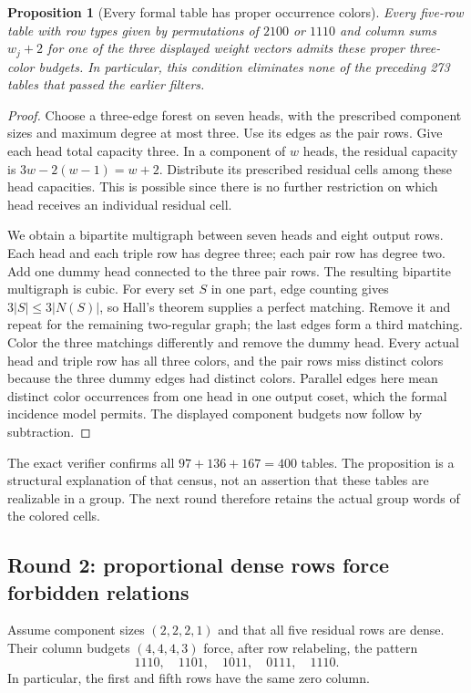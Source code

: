 \documentclass[11pt,a4paper,oneside]{report}
\newtheorem{proposition}[theorem]{Proposition}
\theoremstyle{definition}
\theoremstyle{remark}
\begin{document}
\begin{proposition}[Every formal table has proper occurrence colors]
\label{M13:nextcolor:all-margins}
Every five-row table with row types given by permutations of $2100$
or $1110$ and column sums $w_j+2$ for one of the three displayed
weight vectors admits these proper three-color budgets.
In particular, this condition eliminates none of the preceding
273 tables that passed the earlier filters.
\end{proposition}
\begin{proof}
Choose a three-edge forest on seven heads, with the prescribed
component sizes and maximum degree at most three. Use its edges
as the pair rows. Give each head total capacity three. In a
component of $w$ heads, the residual capacity is
$3w-2(w-1)=w+2$. Distribute its prescribed residual cells among
these head capacities. This is possible since there is no further
restriction on which head receives an individual residual cell.

We obtain a bipartite multigraph between seven heads and eight
output rows. Each head and each triple row has degree three;
each pair row has degree two. Add one dummy head connected to
the three pair rows. The resulting bipartite multigraph is cubic.
For every set $S$ in one part, edge counting gives
$3|S|\le3|N(S)|$, so Hall's theorem supplies a perfect matching.
Remove it and repeat for the remaining two-regular graph; the
last edges form a third matching. Color the three matchings
differently and remove the dummy head. Every actual head and
triple row has all three colors, and the pair rows miss distinct
colors because the three dummy edges had distinct colors.
Parallel edges here mean distinct color occurrences from one head
in one output coset, which the formal incidence model permits.
The displayed component budgets now follow by subtraction.
\end{proof}

The exact verifier confirms all $97+136+167=400$ tables.
The proposition is a structural explanation of that census, not
an assertion that these tables are realizable in a group. The next
round therefore retains the actual group words of the colored cells.

\subsection{Round 2: proportional dense rows force forbidden relations}

Assume component sizes $(2,2,2,1)$ and that all five residual rows
are dense. Their column budgets $(4,4,4,3)$ force, after row
relabeling, the pattern
\begin{equation}\label{M13:nextcolor:dense-pattern}
 1110,\quad1101,\quad1011,\quad0111,\quad1110.
\end{equation}
In particular, the first and fifth rows have the same zero column.
\end{document}
